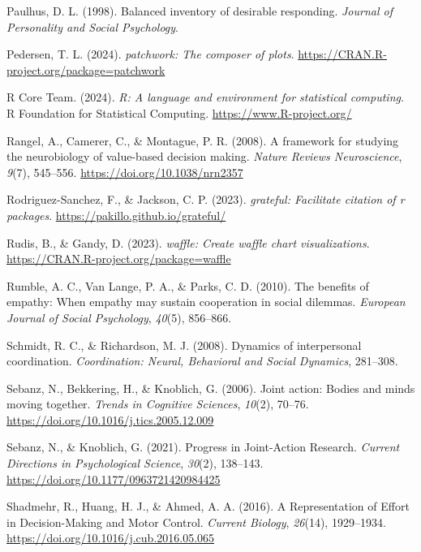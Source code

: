 \documentclass[
  man,
  floatsintext,
  longtable,
  nolmodern,
  notxfonts,
  notimes,
  mask,
  colorlinks=true,linkcolor=blue,citecolor=blue,urlcolor=blue]{apa7}
\newlength{\cslhangindent}
\newenvironment{CSLReferences}[2] %
 {\begin{list}{}{%
  \setlength{\itemindent}{0pt}
  \setlength{\leftmargin}{0pt}
  \setlength{\parsep}{0pt}
  \ifodd #1
   \setlength{\leftmargin}{\cslhangindent}
   \setlength{\itemindent}{-1\cslhangindent}
  \fi
  \setlength{\itemsep}{#2\baselineskip}}}
 {\end{list}}
\begin{document}
\begin{CSLReferences}{1}{0}
Paulhus, D. L. (1998). Balanced inventory of desirable responding.
\emph{Journal of Personality and Social Psychology}.

Pedersen, T. L. (2024). \emph{{patchwork}: The composer of plots}.
\url{https://CRAN.R-project.org/package=patchwork}

R Core Team. (2024). \emph{{R}: A language and environment for
statistical computing}. R Foundation for Statistical Computing.
\url{https://www.R-project.org/}

Rangel, A., Camerer, C., \& Montague, P. R. (2008). A framework for
studying the neurobiology of value-based decision making. \emph{Nature
Reviews Neuroscience}, \emph{9}(7), 545--556.
\url{https://doi.org/10.1038/nrn2357}

Rodriguez-Sanchez, F., \& Jackson, C. P. (2023). \emph{{grateful}:
Facilitate citation of r packages}.
\url{https://pakillo.github.io/grateful/}

Rudis, B., \& Gandy, D. (2023). \emph{{waffle}: Create waffle chart
visualizations}. \url{https://CRAN.R-project.org/package=waffle}

Rumble, A. C., Van Lange, P. A., \& Parks, C. D. (2010). The benefits of
empathy: {When} empathy may sustain cooperation in social dilemmas.
\emph{European Journal of Social Psychology}, \emph{40}(5), 856--866.

Schmidt, R. C., \& Richardson, M. J. (2008). Dynamics of interpersonal
coordination. \emph{Coordination: Neural, Behavioral and Social
Dynamics}, 281--308.

Sebanz, N., Bekkering, H., \& Knoblich, G. (2006). Joint action: Bodies
and minds moving together. \emph{Trends in Cognitive Sciences},
\emph{10}(2), 70--76. \url{https://doi.org/10.1016/j.tics.2005.12.009}

Sebanz, N., \& Knoblich, G. (2021). Progress in {Joint-Action Research}.
\emph{Current Directions in Psychological Science}, \emph{30}(2),
138--143. \url{https://doi.org/10.1177/0963721420984425}

Shadmehr, R., Huang, H. J., \& Ahmed, A. A. (2016). A {Representation}
of {Effort} in {Decision-Making} and {Motor Control}. \emph{Current
Biology}, \emph{26}(14), 1929--1934.
\url{https://doi.org/10.1016/j.cub.2016.05.065}


\end{CSLReferences}
\end{document}
